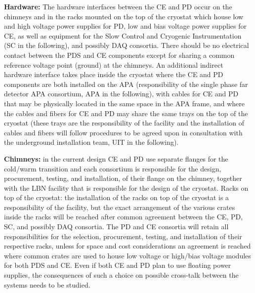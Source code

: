 \hspace{0.5cm}\textbf{Hardware: }The hardware interfaces between the CE and PD occur on the chimneys and in the racks mounted on the top of the cryostat which house low and high voltage power supplies for PD, low and bias voltage power supplies for CE, as well as equipment for the Slow Control and Cryogenic Instrumentation (SC in the following), and possibly DAQ consortia. There should be no electrical contact between the PDS and CE components except for sharing a common reference voltage point (ground) at the chimneys. An additional indirect hardware interface takes place inside the cryostat where the CE and PD components are both installed on the APA (responsibility of the single phase far detector APA consortium, APA in the following), with cables for CE and PD that may be physically located in the same space in the APA frame, and where the cables and fibers for CE and PD may share the same trays on the top of the cryostat (these trays are the responsibility of the facility and the installation of cables and fibers will follow procedures to be agreed upon in consultation with the underground installation team, UIT in the following).

\textbf{Chimneys: }in the current design CE and PD use separate flanges for the cold/warm transition and each consortium is responsible for the design, procurement, testing, and installation, of their flange on the chimney, together with the LBN facility that is responsible for the design of the cryostat.
Racks on top of the cryostat: the installation of the racks on top of the cryostat is a responsibility of the facility, but the exact arrangement of the various crates inside the racks will be reached after common agreement between the CE, PD, SC, and possibly DAQ consortia. The PD and CE consortia will retain all responsibilities for the selection, procurement, testing, and installation of their respective racks, unless for space and cost considerations an agreement is reached where common crates are used to house low voltage or high/bias voltage modules for both PDS and CE. Even if both CE and PD plan to use floating power supplies, the consequences of such a choice on possible cross-talk between the systems needs to be studied. 

